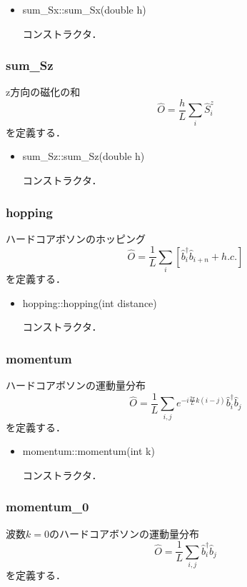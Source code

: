 \documentclass[report, 11pt, uplatex]{jsbook}
\newcommand{\ani}[2]{\hat{{#1}}_{#2}}
\newcommand{\cre}[2]{\hat{{#1}}_{#2}^{\dagger}}
\newcommand{\sbr}[1]{\left[#1\right]}
\begin{document}
	\begin{itemize}
		\item sum\_Sx::sum\_Sx(double h)
		
		コンストラクタ．
	\end{itemize}
	
	
	\subsubsection{sum\_Sz}
	z方向の磁化の和
	\begin{equation}
	\hat{O}=\frac{h}{L}\sum_i\hat{S}^z_i\nonumber
	\end{equation}
	を定義する．
	
	\begin{itemize}
		\item sum\_Sz::sum\_Sz(double h)
		
		コンストラクタ．
	\end{itemize}
	
	\subsubsection{hopping}
	ハードコアボソンのホッピング
	\begin{equation}
	\hat{O}=\frac{1}{L}\sum_i\sbr{\cre{b}{i}\ani{b}{i+n}+h.c.}
	\end{equation}
	を定義する．
	
	\begin{itemize}
		\item hopping::hopping(int distance)
		
		コンストラクタ．
	\end{itemize}
	
	\subsubsection{momentum}
	ハードコアボソンの運動量分布
	\begin{equation}
	\hat{O}=\frac{1}{L}\sum_{i,j}e^{-i\frac{2\pi}{L}k(i-j)}\cre{b}{i}\ani{b}{j}
	\end{equation}
	を定義する．
	
	\begin{itemize}
		\item momentum::momentum(int k)
		
		コンストラクタ．
	\end{itemize}
	
	\subsubsection{momentum\_0}
	波数$k=0$のハードコアボソンの運動量分布
	\begin{equation}
	\hat{O}=\frac{1}{L}\sum_{i,j}\cre{b}{i}\ani{b}{j}
	\end{equation}
	を定義する．
	
\end{document}
